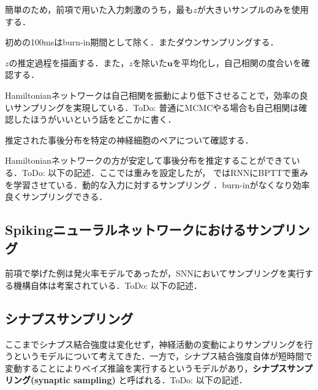 簡単のため，前項で用いた入力刺激のうち，最も$z$が大きいサンプルのみを使用する．






初めの100msはburn-in期間として除く．またダウンサンプリングする．


$z$の推定過程を描画する．また，$z$を除いた$\mathbf{u}$を平均化し，自己相関の度合いを確認する．


Hamiltonianネットワークは自己相関を振動により低下させることで，効率の良いサンプリングを実現している．ToDo: 普通にMCMCやる場合も自己相関は確認したほうがいいという話をどこかに書く．

推定された事後分布を特定の神経細胞のペアについて確認する．



Hamiltonianネットワークの方が安定して事後分布を推定することができている．ToDo: 以下の記述．ここでは重みを設定したが， \citep{Echeveste2020-sh}ではRNNにBPTTで重みを学習させている．動的な入力に対するサンプリング \citep{Berkes2011-xj}．burn-inがなくなり効率良くサンプリングできる．
\subsection{Spikingニューラルネットワークにおけるサンプリング}
前項で挙げた例は発火率モデルであったが，SNNにおいてサンプリングを実行する機構自体は考案されている．ToDo: 以下の記述．\citep{Buesing2011-dm}\citep{Masset2022-wh}\citep{Zhang2022-bl}
\subsection{シナプスサンプリング}
ここまでシナプス結合強度は変化せず，神経活動の変動によりサンプリングを行うというモデルについて考えてきた．一方で，シナプス結合強度自体が短時間で変動することによりベイズ推論を実行するというモデルがあり，\textbf{シナプスサンプリング(synaptic sampling)} と呼ばれる．ToDo: 以下の記述．\citep{Kappel2015-kq}\citep{Aitchison2021-wo}

